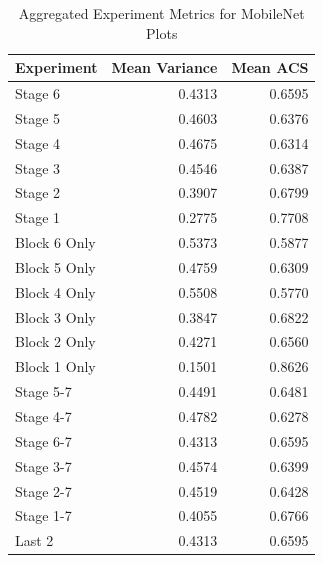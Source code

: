 \begin{table}
\caption{Aggregated Experiment Metrics for MobileNet Plots}
\label{tab:exp_plot_data_mobilenet}
\begin{tabular}{lrr}
\toprule
Experiment & Mean Variance & Mean ACS \\
\midrule
Stage 6 & 0.4313 & 0.6595 \\
Stage 5 & 0.4603 & 0.6376 \\
Stage 4 & 0.4675 & 0.6314 \\
Stage 3 & 0.4546 & 0.6387 \\
Stage 2 & 0.3907 & 0.6799 \\
Stage 1 & 0.2775 & 0.7708 \\
Block 6 Only & 0.5373 & 0.5877 \\
Block 5 Only & 0.4759 & 0.6309 \\
Block 4 Only & 0.5508 & 0.5770 \\
Block 3 Only & 0.3847 & 0.6822 \\
Block 2 Only & 0.4271 & 0.6560 \\
Block 1 Only & 0.1501 & 0.8626 \\
Stage 5-7 & 0.4491 & 0.6481 \\
Stage 4-7 & 0.4782 & 0.6278 \\
Stage 6-7 & 0.4313 & 0.6595 \\
Stage 3-7 & 0.4574 & 0.6399 \\
Stage 2-7 & 0.4519 & 0.6428 \\
Stage 1-7 & 0.4055 & 0.6766 \\
Last 2 & 0.4313 & 0.6595 \\
\bottomrule
\end{tabular}
\end{table}
